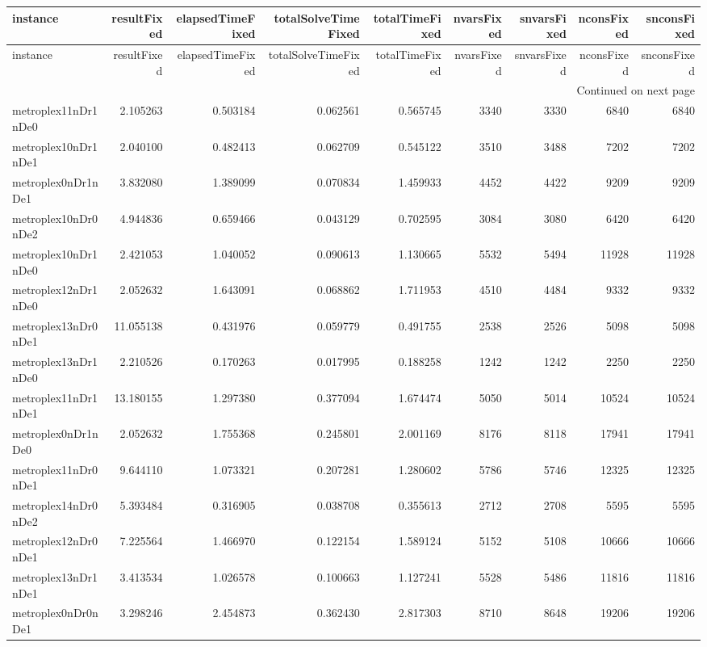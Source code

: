 \begin{longtable}{|l|r|r|r|r|r|r|r|r|}
\toprule
instance & resultFixed & elapsedTimeFixed & totalSolveTimeFixed & totalTimeFixed & nvarsFixed & snvarsFixed & nconsFixed & snconsFixed \\
\midrule
\endfirsthead
\toprule
instance & resultFixed & elapsedTimeFixed & totalSolveTimeFixed & totalTimeFixed & nvarsFixed & snvarsFixed & nconsFixed & snconsFixed \\
\midrule
\endhead
\midrule
\multicolumn{9}{r}{Continued on next page} \\
\midrule
\endfoot
\bottomrule
\endlastfoot
metroplex11nDr1nDe0 & 2.105263 & 0.503184 & 0.062561 & 0.565745 & 3340 & 3330 & 6840 & 6840 \\
metroplex10nDr1nDe1 & 2.040100 & 0.482413 & 0.062709 & 0.545122 & 3510 & 3488 & 7202 & 7202 \\
metroplex0nDr1nDe1 & 3.832080 & 1.389099 & 0.070834 & 1.459933 & 4452 & 4422 & 9209 & 9209 \\
metroplex10nDr0nDe2 & 4.944836 & 0.659466 & 0.043129 & 0.702595 & 3084 & 3080 & 6420 & 6420 \\
metroplex10nDr1nDe0 & 2.421053 & 1.040052 & 0.090613 & 1.130665 & 5532 & 5494 & 11928 & 11928 \\
metroplex12nDr1nDe0 & 2.052632 & 1.643091 & 0.068862 & 1.711953 & 4510 & 4484 & 9332 & 9332 \\
metroplex13nDr0nDe1 & 11.055138 & 0.431976 & 0.059779 & 0.491755 & 2538 & 2526 & 5098 & 5098 \\
metroplex13nDr1nDe0 & 2.210526 & 0.170263 & 0.017995 & 0.188258 & 1242 & 1242 & 2250 & 2250 \\
metroplex11nDr1nDe1 & 13.180155 & 1.297380 & 0.377094 & 1.674474 & 5050 & 5014 & 10524 & 10524 \\
metroplex0nDr1nDe0 & 2.052632 & 1.755368 & 0.245801 & 2.001169 & 8176 & 8118 & 17941 & 17941 \\
metroplex11nDr0nDe1 & 9.644110 & 1.073321 & 0.207281 & 1.280602 & 5786 & 5746 & 12325 & 12325 \\
metroplex14nDr0nDe2 & 5.393484 & 0.316905 & 0.038708 & 0.355613 & 2712 & 2708 & 5595 & 5595 \\
metroplex12nDr0nDe1 & 7.225564 & 1.466970 & 0.122154 & 1.589124 & 5152 & 5108 & 10666 & 10666 \\
metroplex13nDr1nDe1 & 3.413534 & 1.026578 & 0.100663 & 1.127241 & 5528 & 5486 & 11816 & 11816 \\
metroplex0nDr0nDe1 & 3.298246 & 2.454873 & 0.362430 & 2.817303 & 8710 & 8648 & 19206 & 19206 \\

\end{longtable}
